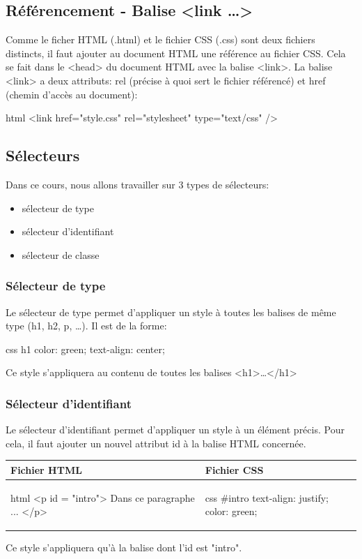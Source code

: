 \documentclass[a4paper,11pt]{article}
\begin{document}
\subsection{Référencement - Balise <link \dots>}
Comme le ficher HTML (.html) et le fichier CSS (.css) sont deux fichiers distincts, il faut ajouter au document HTML une référence au fichier CSS. Cela se fait dans le <head> du document HTML avec la balise <link>.
La balise <link> a deux attributs: rel (précise à quoi sert le fichier référencé) et href (chemin d'accès au document):
\begin{code}{html}
<link href="style.css" rel="stylesheet" type="text/css" />
\end{code}

\subsection{Sélecteurs}
Dans ce cours, nous allons travailler sur 3 types de sélecteurs:
\begin{itemize}
\item sélecteur de type
\item sélecteur d'identifiant
\item sélecteur de classe
\end{itemize}

\subsubsection{Sélecteur de type}
Le sélecteur de type permet d'appliquer un style à toutes les balises de même type (h1, h2, p, \dots).
Il est de la forme: \par
\begin{code}{css}
h1 {
  color: green;
  text-align: center;
}
\end{code}\par
Ce style s'appliquera au contenu de toutes les balises <h1>…</h1>

\subsubsection{Sélecteur d'identifiant}
Le sélecteur d'identifiant permet d'appliquer un style à un élément précis. Pour cela, il faut ajouter un nouvel attribut id à la balise HTML concernée.\par

\begin{tabular}{|l|l|}
\hline
\centering Fichier HTML & Fichier CSS \tabularnewline
\hline
\begin{minipage}{1\textwidth}
\begin{code}{html}
<p id = "intro">
  Dans ce paragraphe ...
</p>
\end{code}
\end{minipage}&
\begin{minipage}{1\textwidth}
\begin{code}{css}
#intro{
  text-align: justify;
  color: green;
}
\end{code}
\end{minipage}\tabularnewline
\hline
\end{tabular}\par
Ce style s'appliquera qu'à la balise dont l'id est "intro".
\end{document}
